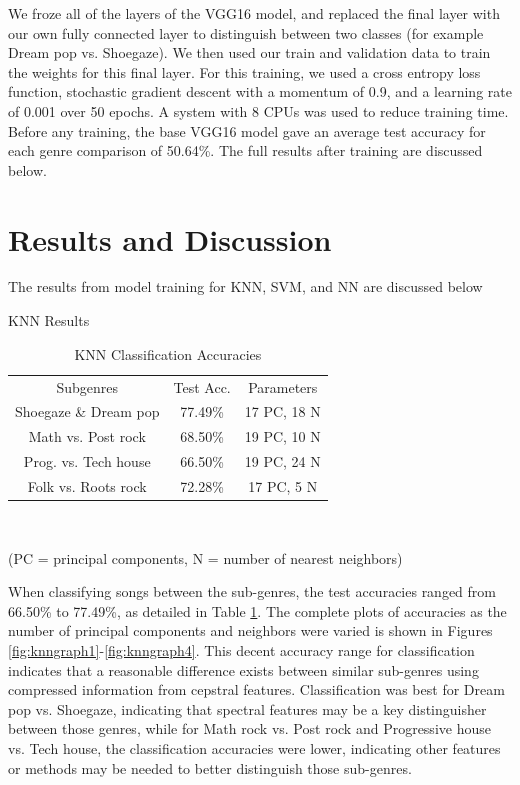 \documentclass[letterpaper, 12 pt, conference]{ieeeconf}  %
\begin{document}
We froze all of the layers of the VGG16 model, and replaced the final layer with our own fully connected layer to distinguish between two classes (for example Dream pop vs. Shoegaze). We then used our train and validation data to train the weights for this final layer. For this training, we used a cross entropy loss function, stochastic gradient descent with a momentum of 0.9, and a learning rate of 0.001 over 50 epochs. A system with 8 CPUs was used to reduce training time. Before any training, the base VGG16 model gave an average test accuracy for each genre comparison of 50.64\%. The full results after training are discussed below.




\section{Results and Discussion}

The results from model training for KNN, SVM, and NN are discussed below
\newline \,\,

\par KNN Results

\begin{table}[!hb]
    \begin{center}
    \caption{KNN Classification Accuracies}{\label{tab:knn_acc}}
    \begin{tabular}{ |c|c|c| }
      Subgenres & Test Acc. & Parameters \\ 
      Shoegaze \& Dream pop & 77.49\% & 17 PC, 18 N\\
      Math vs. Post rock & 68.50\% & 19 PC, 10 N\\
      Prog. vs. Tech house & 66.50\% & 19 PC, 24 N\\
      Folk vs. Roots rock & 72.28\% & 17 PC, 5 N\\
     
    \end{tabular}\\
    \end{center}
    (PC = principal components, N = number of nearest neighbors)
\end{table}

\par When classifying songs between the sub-genres, the test accuracies ranged from 66.50\% to 77.49\%, as detailed in Table \ref{tab:knn_acc}. The complete plots of accuracies as the number of principal components and neighbors were varied is shown in Figures \ref{fig:knngraph1}-\ref{fig:knngraph4}. 
This decent accuracy range for classification indicates that a reasonable difference exists between similar sub-genres using compressed information from cepstral features. Classification was best for Dream pop vs. Shoegaze, indicating that spectral features may be a key distinguisher between those genres, while for Math rock vs. Post rock and Progressive house vs. Tech house, the classification accuracies were lower, indicating other features or methods may be needed to better distinguish those sub-genres. \newline
\end{document}
